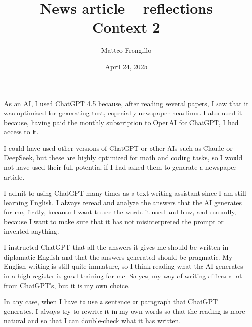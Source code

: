 \documentclass{article}
\title{\textbf{News article -- reflections}\\\textbf{Context 2}}
\author{Matteo Frongillo}
\date{April 24, 2025}
\begin{document}
\maketitle
{}
As an AI, I used ChatGPT 4.5 because, after reading several papers, I saw that it was
optimized for generating text, especially newspaper headlines. I also used it because,
having paid the monthly subscription to OpenAI for ChatGPT, I had access to it.

I could have used other versions of ChatGPT or other AIs such as Claude or DeepSeek, but
these are highly optimized for math and coding tasks, so I would not have used their full
potential if I had asked them to generate a newspaper article.

I admit to using ChatGPT many times as a text-writing assistant since I am still learning
English. I always reread and analyze the answers that the AI generates for me, firstly,
because I want to see the words it used and how, and secondly, because I want to make sure
that it has not misinterpreted the prompt or invented anything.

I instructed ChatGPT that all the answers it gives me should be written in diplomatic
English and that the answers generated should be pragmatic. My English writing is still
quite immature, so I think reading what the AI generates in a high register is good
training for me. So yes, my way of writing differs a lot from ChatGPT’s, but it is my own
choice.

In any case, when I have to use a sentence or paragraph that ChatGPT generates, I always
try to rewrite it in my own words so that the reading is more natural and so that I can
double-check what it has written.
\end{document}
